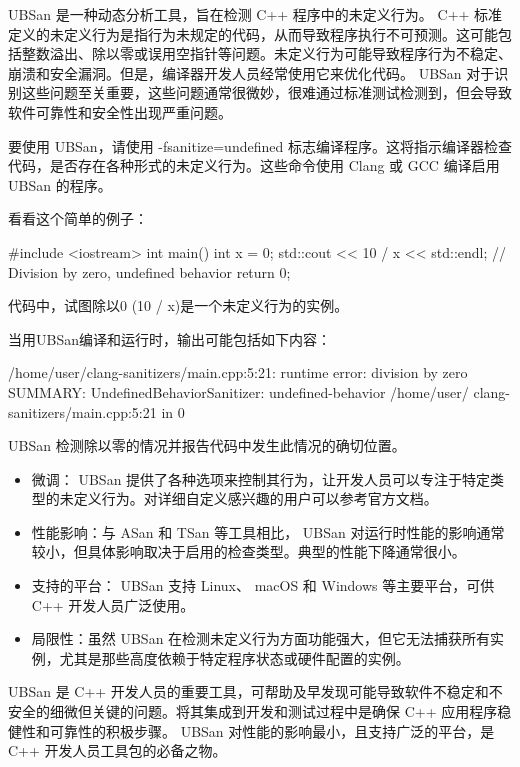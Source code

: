 
UBSan 是一种动态分析工具，旨在检测 C++ 程序中的未定义行为。 C++ 标准定义的未定义行为是指行为未规定的代码，从而导致程序执行不可预测。这可能包括整数溢出、除以零或误用空指针等问题。未定义行为可能导致程序行为不稳定、崩溃和安全漏洞。但是，编译器开发人员经常使用它来优化代码。 UBSan 对于识别这些问题至关重要，这些问题通常很微妙，很难通过标准测试检测到，但会导致软件可靠性和安全性出现严重问题。


要使用 UBSan，请使用 -fsanitize=undefined 标志编译程序。这将指示编译器检查代码，是否存在各种形式的未定义行为。这些命令使用 Clang 或 GCC 编译启用 UBSan 的程序。


看看这个简单的例子：

\begin{cpp}
#include <iostream>
int main() {
    int x = 0;
    std::cout << 10 / x << std::endl; // Division by zero, undefined behavior
    return 0;
}
\end{cpp}

代码中，试图除以0 (10 / x)是一个未定义行为的实例。

当用UBSan编译和运行时，输出可能包括如下内容：

\begin{shell}
/home/user/clang-sanitizers/main.cpp:5:21: runtime error: division by
zero
SUMMARY: UndefinedBehaviorSanitizer: undefined-behavior /home/user/
clang-sanitizers/main.cpp:5:21 in
0
\end{shell}

UBSan 检测除以零的情况并报告代码中发生此情况的确切位置。


\begin{itemize}
\item
微调： UBSan 提供了各种选项来控制其行为，让开发人员可以专注于特定类型的未定义行为。对详细自定义感兴趣的用户可以参考官方文档。

\item
性能影响：与 ASan 和 TSan 等工具相比， UBSan 对运行时性能的影响通常较小，但具体影响取决于启用的检查类型。典型的性能下降通常很小。

\item
支持的平台： UBSan 支持 Linux、 macOS 和 Windows 等主要平台，可供 C++ 开发人员广泛使用。

\item
局限性：虽然 UBSan 在检测未定义行为方面功能强大，但它无法捕获所有实例，尤其是那些高度依赖于特定程序状态或硬件配置的实例。
\end{itemize}

UBSan 是 C++ 开发人员的重要工具，可帮助及早发现可能导致软件不稳定和不安全的细微但关键的问题。将其集成到开发和测试过程中是确保 C++ 应用程序稳健性和可靠性的积极步骤。 UBSan 对性能的影响最小，且支持广泛的平台，是 C++ 开发人员工具包的必备之物。

